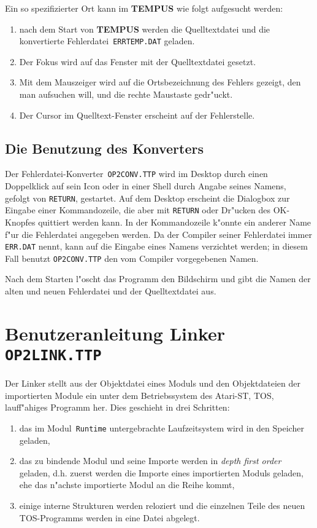Ein so spezifizierter Ort kann im {\bf TEMPUS} wie folgt aufgesucht werden:
\begin{enumerate}
\item nach dem Start von {\bf TEMPUS} werden die Quelltextdatei und die
  konvertierte Fehlerdatei~{\tt ERRTEMP.DAT} geladen.
\item Der Fokus wird auf das Fenster mit der Quelltextdatei gesetzt.
\item Mit dem Mauszeiger wird auf die Ortsbezeichnung des Fehlers gezeigt,
  den man aufsuchen will, und die rechte Maustaste gedr"uckt.
\item Der Cursor im Quelltext-Fenster erscheint auf der Fehlerstelle.
\end{enumerate}

\subsection{Die Benutzung des Konverters}

Der Fehlerdatei-Konverter~{\tt OP2CONV.TTP} wird im Desktop durch einen Doppelklick
auf sein Icon oder in einer Shell durch Angabe seines Namens, gefolgt von {\tt RETURN},
gestartet.
Auf dem Desktop erscheint die Dialogbox zur Eingabe einer Kommandozeile,
die aber mit {\tt RETURN} oder Dr"ucken des OK-Knopfes quittiert werden kann.
In der Kommandozeile k"onnte ein anderer Name f"ur die Fehlerdatei angegeben
werden.
Da der Compiler seiner Fehlerdatei immer {\tt ERR.DAT} nennt, kann auf die
Eingabe eines Namens verzichtet werden; in diesem Fall benutzt {\tt OP2CONV.TTP}
den vom Compiler vorgegebenen Namen.

Nach dem Starten l"oscht das Programm den Bildschirm und gibt die Namen der
alten und neuen Fehlerdatei und der Quelltextdatei aus.

\section{Benutzeranleitung Linker {\tt OP2LINK.TTP}}

Der Linker stellt aus der Objektdatei eines Moduls und den Objektdateien
der importierten Module ein unter dem Betriebssystem des Atari-ST, TOS,
lauff"ahiges Programm her.
Dies geschieht in drei Schritten:
\begin{enumerate}
\item das im Modul~{\tt Runtime} untergebrachte Laufzeitsystem wird in
  den Speicher geladen,
\item das zu bindende Modul und seine Importe werden in {\it depth first order\/}
  geladen, d.h. zuerst werden die Importe eines importierten Moduls
  geladen, ehe das n"achste importierte Modul an die Reihe kommt,
\item einige interne Strukturen werden reloziert und die einzelnen
  Teile des neuen TOS-Programms werden in eine Datei abgelegt.
\end{enumerate}

